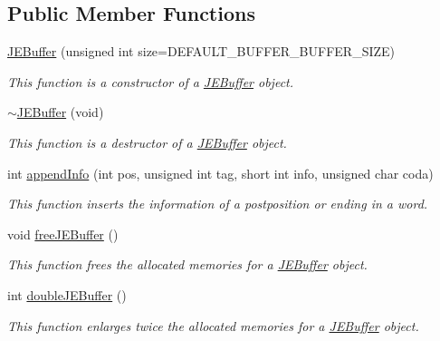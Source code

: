 \subsection*{Public Member Functions}
\begin{CompactItemize}
\item 
\hyperlink{classkmaOrange_1_1JEBuffer_3778d966cc4cf4e93b22e0e17ca84e92}{JEBuffer} (unsigned int size=DEFAULT\_\-BUFFER\_\-BUFFER\_\-SIZE)
\begin{CompactList}\small\item\em This function is a constructor of a \hyperlink{classkmaOrange_1_1JEBuffer}{JEBuffer} object. \item\end{CompactList}\item 
\hyperlink{classkmaOrange_1_1JEBuffer_ff64ccdec4b316f7d2dd23bd66693f82}{$\sim$JEBuffer} (void)
\begin{CompactList}\small\item\em This function is a destructor of a \hyperlink{classkmaOrange_1_1JEBuffer}{JEBuffer} object. \item\end{CompactList}\item 
int \hyperlink{classkmaOrange_1_1JEBuffer_aaaffab5a6c0ecad023a286ab81124c1}{appendInfo} (int pos, unsigned int tag, short int info, unsigned char coda)
\begin{CompactList}\small\item\em This function inserts the information of a postposition or ending in a word. \item\end{CompactList}\item 
void \hyperlink{classkmaOrange_1_1JEBuffer_516f7964ac619106e7a8f5aef02bd3a0}{freeJEBuffer} ()
\begin{CompactList}\small\item\em This function frees the allocated memories for a \hyperlink{classkmaOrange_1_1JEBuffer}{JEBuffer} object. \item\end{CompactList}\item 
int \hyperlink{classkmaOrange_1_1JEBuffer_7a5fb7133ad58c60dafd9e9ab5c1158b}{doubleJEBuffer} ()
\begin{CompactList}\small\item\em This function enlarges twice the allocated memories for a \hyperlink{classkmaOrange_1_1JEBuffer}{JEBuffer} object. \item\end{CompactList}\item 

\end{CompactItemize}
